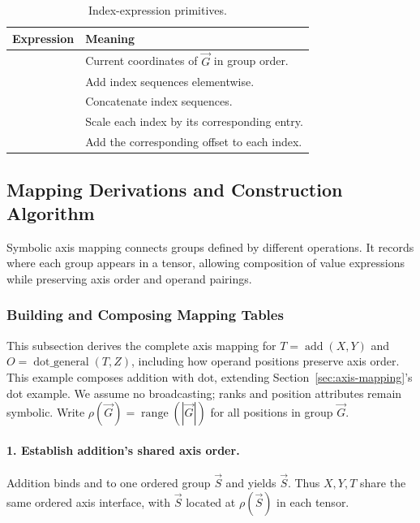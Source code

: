\begin{table}[htbp]
\caption{Index-expression primitives.}
\label{extended:tab:index-expressions}
\begin{tabularx}{\linewidth}{@{}lY@{}}\toprule
Expression & Meaning\\\midrule
{} & Current coordinates of $\vec G$ in group order.\\
 & Add index sequences elementwise.\\
 & Concatenate index sequences.\\
 & Scale each index by its corresponding entry.\\
 & Add the corresponding offset to each index.\\\bottomrule
\end{tabularx}
\end{table}


\FloatBarrier
\subsection{Mapping Derivations and Construction Algorithm}
\label{app:mapping}
Symbolic axis mapping connects groups defined by different operations. It
records where each group appears in a tensor, allowing composition of value
expressions while preserving axis order and operand pairings.


\subsubsection{Building and Composing Mapping Tables}
\label{extended:sec:mapping-tables}
This subsection derives the complete axis mapping for
$T=\operatorname{add}(X,Y)$ and $O=\operatorname{dot\_general}(T,Z)$,
including how operand positions preserve axis order. This example composes
addition with dot, extending Section~\ref{sec:axis-mapping}'s dot example.
We assume no broadcasting; ranks and position attributes remain symbolic.
Write $\rho(\vec G)=\operatorname{range}(|\vec G|)$ for all positions in group $\vec G$.

\paragraph{1. Establish addition's shared axis order.}
Addition binds  and  to one ordered group $\vec S$ and yields $\vec S$.
Thus $X,Y,T$ share the same ordered axis interface, with $\vec S$ located at
$\rho(\vec S)$ in each tensor.

